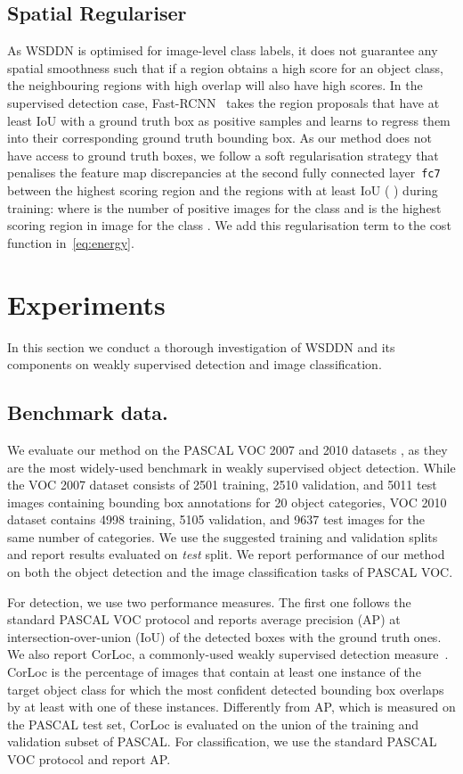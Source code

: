 \documentclass[10pt,twocolumn,letterpaper]{article}
\begin{document}
\subsection{Spatial Regulariser}
As WSDDN is optimised for image-level class labels, it does not guarantee any spatial smoothness such that if a region obtains a high score for an object class, the neighbouring regions with high overlap will also have high scores. In the supervised detection case, Fast-RCNN~\cite{Girshick15} takes the region proposals that have at least  IoU with a ground truth box as positive samples and learns to regress them into their corresponding ground truth bounding box. As our method does not have access to ground truth boxes, we follow a soft regularisation strategy that penalises the feature map discrepancies at the second fully connected layer~\texttt{fc7} between the highest scoring region and the regions with at least  IoU (\ie\; ) during training:
 where  is the number of positive images for the class  and  is the highest scoring region in image  for the class . We add this regularisation term to the cost function in~\cref{eq:energy}. 
 
\section{Experiments}\label{s:experiments}
In this section we conduct a thorough investigation of WSDDN and its components on weakly supervised detection and image classification.

\subsection{Benchmark data.}
We evaluate our method on the PASCAL VOC 2007 and 2010 datasets \cite{Everingham10}, as they are the most widely-used benchmark in weakly supervised object detection. While the VOC 2007 dataset consists of 2501 training, 2510 validation, and 5011 test images containing bounding box annotations for 20 object categories, VOC 2010 dataset contains 4998 training, 5105 validation, and 9637 test images for the same number of categories. We use the suggested training and validation splits and report results evaluated on \emph{test} split. We report performance of our method on both the object detection and the image classification tasks of PASCAL VOC. 

For detection, we use two performance measures. The first one follows the standard PASCAL VOC protocol and reports average precision (AP) at   intersection-over-union (IoU) of the detected boxes with the ground truth ones. We also report CorLoc, a commonly-used weakly supervised detection measure~\cite{Deselaers12}. CorLoc is the percentage of images that contain at least one instance of the target object class for which the most confident detected bounding box overlaps by at least  with one of these instances. Differently from AP, which is measured on the PASCAL test set, CorLoc is evaluated on the union of the training and validation subset of PASCAL. For classification, we use the standard PASCAL VOC protocol and report AP.
\end{document}
